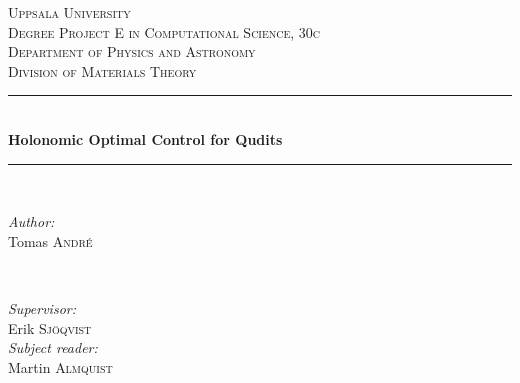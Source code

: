 \documentclass[a4paper, 12pt]{article}
\newcommand{\HRule}{\rule{\linewidth}{0.5mm}} %
\begin{document}
\begin{titlepage}


\center %
 
 
 

\textsc{\LARGE Uppsala University}\\[1.5cm] %
\textsc{\Large Degree Project E in Computational Science, 30c}\\[0.5cm] %
\textsc{\large Department of Physics and Astronomy\\ Division of Materials Theory}\\[0.5cm] %


\HRule \\[0.4cm]
{ \huge \bfseries Holonomic Optimal Control for Qudits}\\[0.4cm] %
\HRule \\[1.5cm]
 

\begin{minipage}{0.4\textwidth}
\begin{flushleft} \large
\emph{Author:}\\
Tomas \textsc{André} %
\end{flushleft}
\end{minipage}
~
\begin{minipage}{0.4\textwidth}
\begin{flushright} \large
\emph{Supervisor:} \\
Erik \textsc{Sjöqvist} \\
\emph{Subject reader:} \\
Martin \textsc{Almquist} %
\end{flushright}
\end{minipage}\\[2cm]


\end{titlepage}
\end{document}
